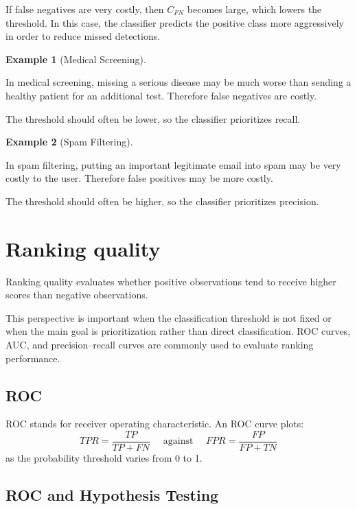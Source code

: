 \documentclass[
  letterpaper,
  DIV=11,
  numbers=noendperiod]{scrreprt}
\theoremstyle{definition}
\theoremstyle{definition}
\newtheorem{example}{Example}[chapter]
\theoremstyle{plain}
\theoremstyle{plain}
\theoremstyle{remark}
\begin{document}
If false negatives are very costly, then \(C_{FN}\) becomes large, which
lowers the threshold. In this case, the classifier predicts the positive
class more aggressively in order to reduce missed detections.

\begin{example}[Medical
Screening]\protect\hypertarget{exm-}{}\label{exm-}

In medical screening, missing a serious disease may be much worse than
sending a healthy patient for an additional test. Therefore false
negatives are costly.

The threshold should often be lower, so the classifier prioritizes
recall.

\end{example}

\begin{example}[Spam Filtering]\protect\hypertarget{exm-}{}\label{exm-}

In spam filtering, putting an important legitimate email into spam may
be very costly to the user. Therefore false positives may be more
costly.

The threshold should often be higher, so the classifier prioritizes
precision.

\end{example}

\section{Ranking quality}\label{ranking-quality}

Ranking quality evaluates whether positive observations tend to receive
higher scores than negative observations.

This perspective is important when the classification threshold is not
fixed or when the main goal is prioritization rather than direct
classification. ROC curves, AUC, and precision--recall curves are
commonly used to evaluate ranking performance.

\subsection{ROC}\label{roc}

ROC stands for receiver operating characteristic. An ROC curve plots: \[
TPR
=
\frac{TP}{TP+FN}
\quad\text{ against }\quad
FPR
=
\frac{FP}{FP+TN}
\] as the probability threshold varies from 0 to 1.

\subsection{ROC and Hypothesis
Testing}\label{roc-and-hypothesis-testing}
\end{document}
